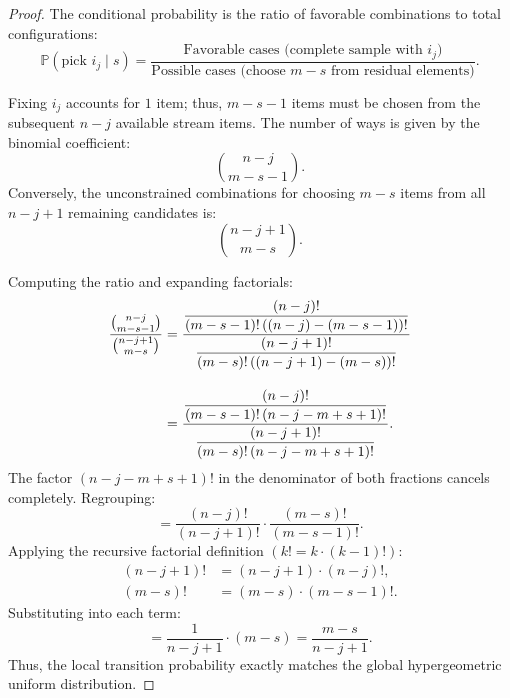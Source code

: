 \begin{proof}
The conditional probability is the ratio of favorable combinations to total configurations:
\begin{equation}
  \mathbb{P}(\text{pick } i_j \mid s) = \frac{\text{Favorable cases (complete sample with } i_j)}{\text{Possible cases (choose } m - s \text{ from residual elements)}}.
\end{equation}

Fixing $i_j$ accounts for $1$ item; thus, $m - s - 1$ items must be chosen from the subsequent $n - j$ available stream items. The number of ways is given by the binomial coefficient:
\begin{equation}
  \binom{n - j}{m - s - 1}.
\end{equation}
Conversely, the unconstrained combinations for choosing $m - s$ items from all $n - j + 1$ remaining candidates is:
\begin{equation}
  \binom{n - j + 1}{m - s}.
\end{equation}

Computing the ratio and expanding factorials:
\begin{align}
  \frac{\binom{n - j}{m - s - 1}}{\binom{n - j + 1}{m - s}} &= \frac{\dfrac{(n - j)!}{(m - s - 1)! \, ((n - j) - (m - s - 1))!}}{\dfrac{(n - j + 1)!}{(m - s)! \, ((n - j + 1) - (m - s))!}} \notag\\[1em]
  &= \frac{\dfrac{(n - j)!}{(m - s - 1)! \, (n - j - m + s + 1)!}}{\dfrac{(n - j + 1)!}{(m - s)! \, (n - j - m + s + 1)!}}.
\end{align}
The factor $(n - j - m + s + 1)!$ in the denominator of both fractions cancels completely. Regrouping:
\begin{equation}
  = \frac{(n - j)!}{(n - j + 1)!} \cdot \frac{(m - s)!}{(m - s - 1)!}.
\end{equation}
Applying the recursive factorial definition $(k! = k \cdot (k-1)!)$:
\begin{align}
  (n - j + 1)! &= (n - j + 1) \cdot (n - j)!, \\
  (m - s)! &= (m - s) \cdot (m - s - 1)!.
\end{align}
Substituting into each term:
\begin{equation}
  = \frac{1}{n - j + 1} \cdot (m - s) = \frac{m - s}{n - j + 1}.
\end{equation}
Thus, the local transition probability exactly matches the global hypergeometric uniform distribution.
\end{proof}

